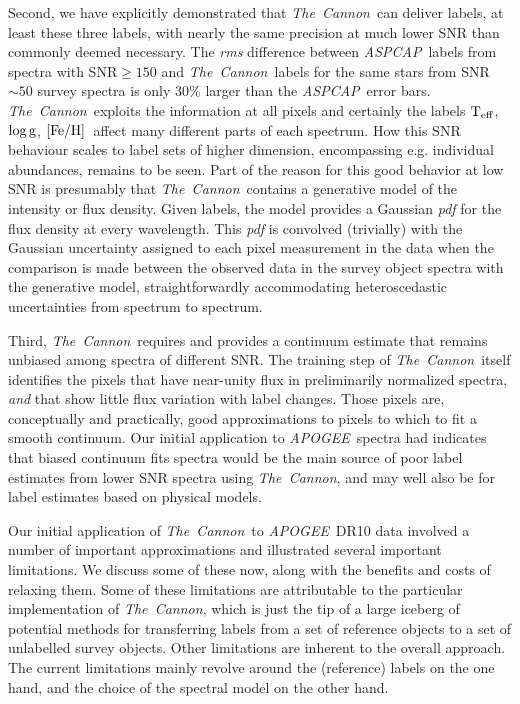 \documentclass[12pt, preprint]{aastex}
\newcommand{\tc}{\textsl{The~Cannon}}
\newcommand{\apogee}{\textsl{APOGEE}}
\newcommand{\aspcap}{\textsl{ASPCAP}}
\newcommand{\teff}{\mbox{$\rm T_{eff}$}}
\newcommand{\feh}{\mbox{$\rm [Fe/H]$}}
\newcommand{\logg}{\mbox{$\rm \log g$}}
\begin{document}
Second, we have explicitly demonstrated that \tc\ can deliver labels, at least these three labels, 
with nearly the same precision at much lower SNR than commonly deemed necessary. 
The \textit{rms} difference between  \aspcap\ labels from spectra with SNR$\ge150$ and \tc\ labels
for the same stars from SNR$ \sim 50$ survey spectra is only 30\% larger than the \aspcap\ error bars. 
\tc\  exploits the information at all pixels and certainly the labels \teff, \logg, \feh\  affect many different parts of each spectrum. How this SNR behaviour scales to label sets of higher dimension, encompassing e.g. individual abundances, remains to be seen. Part of the reason for this good behavior at low SNR is presumably that
\tc\ contains a generative model of the intensity or flux density.
Given labels, the model provides a Gaussian \textit{pdf} for the flux density at every wavelength.
This \textit{pdf} is convolved (trivially) with the Gaussian uncertainty
assigned to each pixel measurement in the data when the comparison is
made between the observed data in the survey object spectra with the
generative model, straightforwardly accommodating
heteroscedastic uncertainties from spectrum to spectrum.

Third, \tc\ requires and provides a continuum estimate that remains  
unbiased among spectra of different SNR. The training step of \tc\ itself identifies the 
pixels that have near-unity flux in preliminarily normalized spectra, {\it and} that show little flux variation with 
label changes. Those pixels are, conceptually and practically, good approximations to pixels to which to fit a smooth continuum. Our initial application to \apogee\ spectra had indicates that biased continuum fits spectra would be the main source of poor label estimates from lower SNR spectra using \tc , and may well also be for label estimates based on physical models. 

Our initial application of \tc\ to \apogee\  DR10 data involved a number of important approximations and illustrated several important limitations. 
We discuss some of these now, along with the benefits and costs of relaxing
them. Some of these limitations are attributable to the 
particular implementation of \tc , which is just the tip of a large iceberg of potential
methods for transferring labels from a set of reference objects to a
set of unlabelled survey objects. Other limitations are inherent to the overall approach. 
The current limitations mainly revolve around the (reference) labels on the one hand, and the choice 
of the spectral model on the other hand. 
\end{document}

